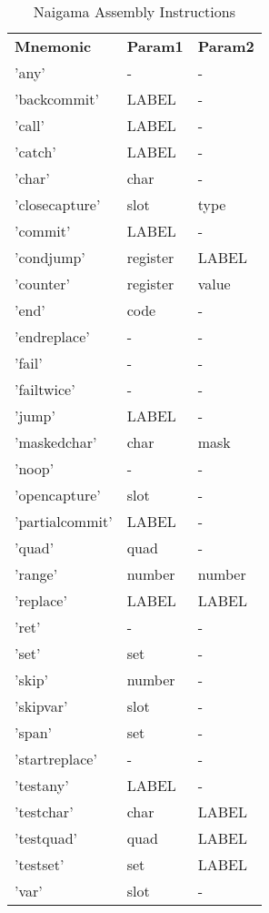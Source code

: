 
\begin{table}[]
\centering
\caption{Naigama Assembly Instructions}
\label{tab:naig_assembly}
\begin{tabular}{lll}
\textbf{Mnemonic} & \textbf{Param1} & \textbf{Param2} \\
'any' & - & - \\
'backcommit' & LABEL & - \\
'call' & LABEL & - \\
'catch' & LABEL & - \\
'char' & char & - \\
'closecapture' & slot & type \\
'commit' & LABEL & - \\
'condjump' & register & LABEL \\
'counter' & register & value \\
'end' & code & - \\
'endreplace' & - & - \\
'fail' & - & - \\
'failtwice' & - & - \\
'jump' & LABEL & - \\
'maskedchar' & char & mask \\
'noop' & - & - \\
'opencapture' & slot & - \\
'partialcommit' & LABEL & - \\
'quad' & quad & - \\
'range' & number & number \\
'replace' & LABEL & LABEL \\
'ret' & - & - \\
'set' & set & - \\
'skip' & number & - \\
'skipvar' & slot & - \\
'span' & set & - \\
'startreplace' & - & - \\
'testany' & LABEL & - \\
'testchar' & char & LABEL \\
'testquad' & quad & LABEL \\
'testset' & set & LABEL \\
'var' & slot & - \\
\end{tabular}
\end{table}
